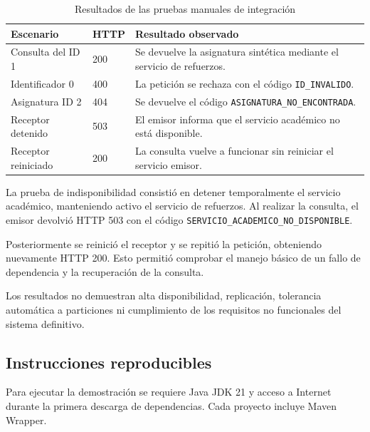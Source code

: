 \begin{table}[htbp]
\centering
\caption{Resultados de las pruebas manuales de integración}
\label{tab:pruebas-esqueleto}
\small
\begin{tabularx}{\textwidth}{@{}p{}p{}X@{}}
\toprule
\textbf{Escenario} &
\textbf{HTTP} &
\textbf{Resultado observado} \\
\midrule

Consulta del ID 1 & 200 & Se devuelve la asignatura sintética mediante el servicio de refuerzos. \\

Identificador 0 & 400 & La petición se rechaza con el código \texttt{ID\_INVALIDO}. \\

Asignatura ID 2 & 404 & Se devuelve el código \texttt{ASIGNATURA\_NO\_ENCONTRADA}. \\

Receptor detenido & 503 & El emisor informa que el servicio académico no está disponible. \\

Receptor reiniciado & 200 & La consulta vuelve a funcionar sin reiniciar el servicio emisor. \\

\bottomrule
\end{tabularx}
\end{table}

La prueba de indisponibilidad consistió en detener temporalmente el servicio académico, manteniendo activo el servicio de refuerzos. Al realizar la consulta, el emisor devolvió HTTP 503 con el código \texttt{SERVICIO\_ACADEMICO\_NO\_DISPONIBLE}.

Posteriormente se reinició el receptor y se repitió la petición, obteniendo nuevamente HTTP 200. Esto permitió comprobar el manejo básico de un fallo de dependencia y la recuperación de la consulta.

Los resultados no demuestran alta disponibilidad, replicación, tolerancia automática a particiones ni cumplimiento de los requisitos no funcionales del sistema definitivo.

\subsection{Instrucciones reproducibles}

Para ejecutar la demostración se requiere Java JDK 21 y acceso a Internet durante la primera descarga de dependencias. Cada proyecto incluye Maven Wrapper.

